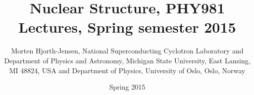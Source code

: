 \documentclass{beamer}
\begin{document}




\title{Nuclear Structure, PHY981  Lectures, Spring semester 2015}


\author{Morten Hjorth-Jensen, National Superconducting Cyclotron Laboratory and Department of Physics and Astronomy, Michigan State University, East Lansing, MI 48824, USA and Department of Physics, University of Oslo, Oslo, Norway\inst{}}
\institute{}

\date{Spring 2015 
}

\begin{frame}
\titlepage
\end{frame}
\end{document}
